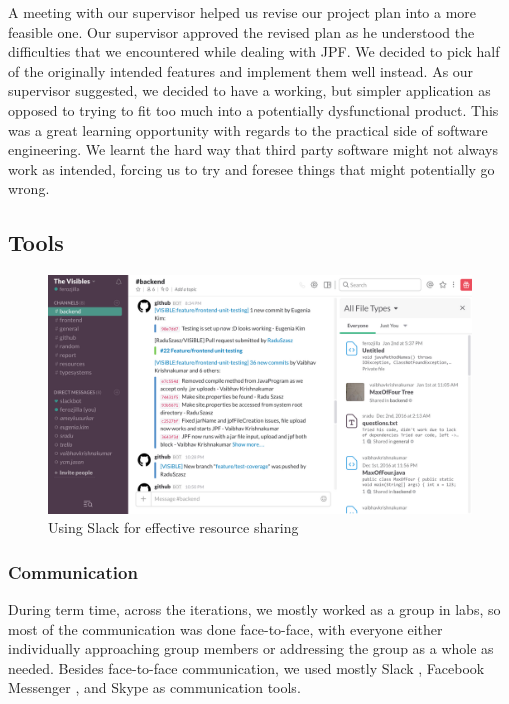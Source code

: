 \documentclass[titlepage,11pt]{article}
\begin{document}
A meeting with our supervisor helped us revise our project plan into a more feasible one. Our supervisor approved the revised plan as he understood the difficulties that we encountered while dealing with JPF. We decided to pick half of the originally intended features and implement them well instead. As our supervisor suggested, we decided to have a working, but simpler application as opposed to trying to fit too much into a potentially dysfunctional product. This was a great learning opportunity with regards to the practical side of software engineering. We learnt the hard way that third party software might not always work as intended, forcing us to try and foresee things that might potentially go wrong.

\subsection{Tools}

\begin{figure}
\centering
\includegraphics[scale=0.35]{slack.png}
\caption{Using Slack for effective resource sharing}
\label{fig:slack}
\end{figure}

\subsubsection{Communication}

During term time, across the iterations, we mostly worked as a group in labs, so most of the communication was done face-to-face, with everyone either individually approaching group members or addressing the group as a whole as needed. Besides face-to-face communication, we used mostly Slack \cite{slack}, Facebook Messenger \cite{messenger}, and Skype \cite{skype} as communication tools. \\
\end{document}
